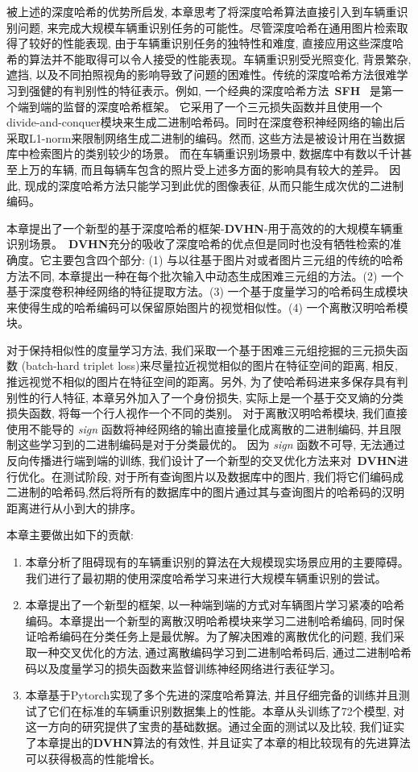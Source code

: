 被上述的深度哈希的优势所启发, 本章思考了将深度哈希算法直接引入到车辆重识别问题, 来完成大规模车辆重识别任务的可能性。尽管深度哈希在通用图片检索取得了较好的性能表现, 由于车辆重识别任务的独特性和难度, 直接应用这些深度哈希的算法并不能取得可以令人接受的性能表现。车辆重识别受光照变化, 背景繁杂, 遮挡, 以及不同拍照视角的影响导致了问题的困难性。传统的深度哈希方法很难学习到强健的有判别性的特征表示。例如, 一个经典的深度哈希方法~\textbf{SFH}~\cite{lai2015simultaneous} 是第一个端到端的监督的深度哈希框架。 它采用了一个三元损失函数并且使用一个divide-and-conquer模块来生成二进制哈希码。同时在深度卷积神经网络的输出后采取L1-norm来限制网络生成二进制的编码。然而, 这些方法是被设计用在当数据库中检索图片的类别较少的场景。 而在车辆重识别场景中, 数据库中有数以千计甚至上万的车辆, 而且每辆车包含的照片受上述多方面的影响具有较大的差异。 因此, 现成的深度哈希方法只能学习到此优的图像表征, 从而只能生成次优的二进制编码。\par
本章提出了一个新型的基于深度哈希的框架-\textbf{DVHN}-用于高效的的大规模车辆重识别场景。~\textbf{DVHN}充分的吸收了深度哈希的优点但是同时也没有牺牲检索的准确度。它主要包含四个部分: (1) 与以往基于图片对或者图片三元组的传统的哈希方法不同, 本章提出一种在每个批次输入中动态生成困难三元组的方法。(2) 一个基于深度卷积神经网络的特征提取方法。(3) 一个基于度量学习的哈希码生成模块来使得生成的哈希编码可以保留原始图片的视觉相似性。(4) 一个离散汉明哈希模块。 \par
对于保持相似性的度量学习方法, 我们采取一个基于困难三元组挖掘的三元损失函数 (batch-hard triplet loss)来尽量拉近视觉相似的图片在特征空间的距离, 相反, 推远视觉不相似的图片在特征空间的距离。另外, 为了使哈希码进来多保存具有判别性的行人特征, 本章另外加入了一个身份损失, 实际上是一个基于交叉熵的分类损失函数, 将每一个行人视作一个不同的类别。 对于离散汉明哈希模块, 我们直接使用不能导的 \textit{sign} 函数将神经网络的输出直接量化成离散的二进制编码, 并且限制这些学习到的二进制编码是对于分类最优的。 因为 \textit{sign} 函数不可导, 无法通过反向传播进行端到端的训练, 我们设计了一个新型的交叉优化方法来对~\textbf{DVHN}进行优化。在测试阶段, 对于所有查询图片以及数据库中的图片, 我们将它们编码成二进制的哈希码,然后将所有的数据库中的图片通过其与查询图片的哈希码的汉明距离进行从小到大的排序。 \par
本章主要做出如下的贡献:
\begin{enumerate}
    \item 本章分析了阻碍现有的车辆重识别的算法在大规模现实场景应用的主要障碍。我们进行了最初期的使用深度哈希学习来进行大规模车辆重识别的尝试。
    \item 本章提出了一个新型的框架, 以一种端到端的方式对车辆图片学习紧凑的哈希编码。本章提出一个新型的离散汉明哈希模块来学习二进制哈希编码, 同时保证哈希编码在分类任务上是最优解。为了解决困难的离散优化的问题, 我们采取一种交叉优化的方法, 通过离散编码学习到二进制哈希码后, 通过二进制哈希码以及度量学习的损失函数来监督训练神经网络进行表征学习。
    \item 本章基于Pytorch实现了多个先进的深度哈希算法, 并且仔细完备的训练并且测试了它们在标准的车辆重识别数据集上的性能。本章从头训练了72个模型, 对这一方向的研究提供了宝贵的基础数据。通过全面的测试以及比较, 我们证实了本章提出的\textbf{DVHN}算法的有效性, 并且证实了本章的相比较现有的先进算法可以获得极高的性能增长。
\end{enumerate}

